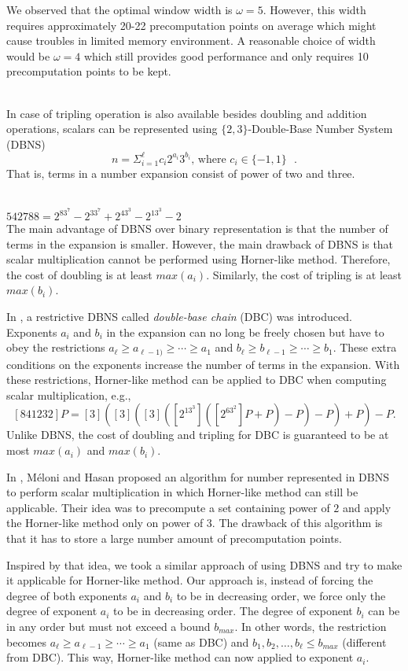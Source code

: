 We observed that the optimal window width is $\omega = 5$.
However, this width requires approximately 20-22 precomputation points on average
which might cause troubles in limited memory environment.
A reasonable choice of width would be $\omega = 4$ which still provides good performance
and only requires 10 precomputation points to be kept.



 \\
\label{sec:dbns}
In case of tripling operation is also available besides doubling and addition operations,
scalars can be represented using $\{2,3\}$-Double-Base Number System (DBNS)
$$n = \Sigma^{\ell}_{i=1} c_i 2^{a_i}3^{b_i} \text{, where $c_i \in \{-1,1\}$ }.$$
That is, terms in a number expansion consist of power of two and three.

 \\
$542788 = 2^83^7 - 2^33^7 + 2^43^3 - 2^13^3 - 2$
\\

The main advantage of DBNS over binary representation is that the number of terms in the expansion is smaller.
However, the main drawback of DBNS is that scalar multiplication cannot be performed using Horner-like method.
Therefore, the cost of doubling is at least $max(a_i)$.  Similarly, the cost of tripling is at least $max(b_i)$.

In \cite{DIM05}, a restrictive DBNS called {\it{double-base chain}} (DBC) was introduced.
Exponents $a_i$ and $b_i$ in the expansion can no long be freely chosen but have to obey the restrictions
$a_\ell \ge a_{\ell-1)} \ge \cdots \ge a_1$ and $b_\ell \ge b_{\ell-1} \ge \cdots \ge b_1$.
These extra conditions on the exponents increase the number of terms in the expansion.
With these restrictions, Horner-like method can be applied to DBC when computing scalar multiplication, e.g.,
$$[841232]P = [3]([3]([3]([2^13^3]([2^63^2]P+P)-P)-P)+P)-P.$$
Unlike DBNS, the cost of doubling and tripling for DBC is guaranteed to be at most $max(a_i)$ and $max(b_i)$.

In \cite{MH09}, M\'eloni and Hasan proposed an algorithm for number represented in DBNS to perform scalar multiplication
in which Horner-like method can still be applicable.
Their idea was to precompute a set containing power of $2$ and apply the Horner-like method only on power of $3$.
The drawback of this algorithm is that it has to store a large number amount of precomputation points.

Inspired by that idea, we took a similar approach of using DBNS and try to make it applicable for Horner-like method.
Our approach is, instead of forcing the degree of both exponents $a_i$ and $b_i$ to be in decreasing order,
we force only the degree of exponent $a_i$ to be in decreasing order.
The degree of exponent $b_i$ can be in any order but must not exceed a bound $b_{max}$.
In other words, the restriction becomes
$a_\ell \ge a_{\ell-1} \ge \cdots \ge a_1$ (same as DBC) and $b_1,b_2,\dots,b_\ell \le b_{max}$ (different from DBC).
This way, Horner-like method can now applied to exponent $a_i$.

